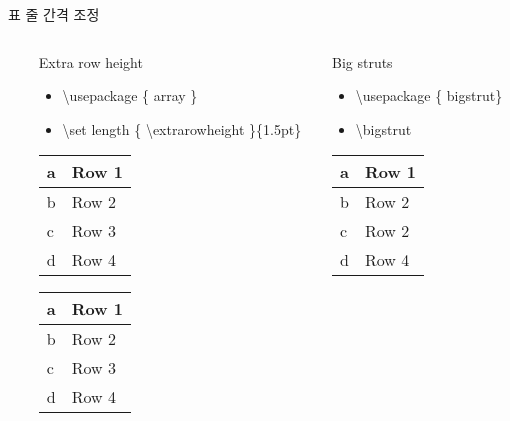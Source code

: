 \documentclass[ aspectratio=149,  14pt,blue,xcolor=pdftex,dvipsnames,table,handout,notes]{beamer}
\begin{document}
\begin{frame}[t]{표 줄 간격 조정}
\begin{columns}[t]
\begin{column}{0.3\textwidth}
		\end{column}

		\begin{column}{0.3\textwidth}
		\begin{block}{Extra row height}
		\begin{itemize}
		\item[] \textbackslash usepackage \{ array \}
		\item[] \textbackslash set length \{ \textbackslash extrarowheight \}\{1.5pt\}
		\end{itemize}
		\end{block}

		{
		\setlength{\extrarowheight}{1.0em}
		\begin{tabular}{|l|l|}
		\hline
		a & Row 1 \\ \hline
		b & Row 2 \\ \hline
		c & Row 3 \\
		d & Row 4 \\ \hline
		\end{tabular}
		}

		{
		\setlength{\extrarowheight}{2.0em}
		\begin{tabular}{|l|l|}
		\hline
		a & Row 1 \\ \hline
		b & Row 2 \\ \hline
		c & Row 3 \\
		d & Row 4 \\ \hline
		\end{tabular}
		}

		\end{column}

		\begin{column}{0.3\textwidth}
		\begin{block}{Big struts}
		\begin{itemize}
		\item[] \textbackslash usepackage \{ bigstrut\}
		\item[] \textbackslash bigstrut
		\end{itemize}
		\end{block}

		\begin{tabular}{|l|l|}
		\hline
		a & Row 1 \bigstrut \\ \hline
		b & Row 2 \bigstrut \\ \hline
		c & Row 2 \bigstrut[t] \\
		d & Row 4 \bigstrut[b] \\ \hline
		\end{tabular}



\end{column}
\end{columns}
\end{frame}
\end{document}
